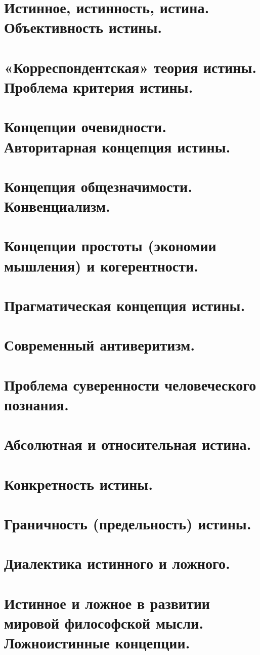 \section{ Истинное, истинность, истина. Объективность истины.}
\section{ «Корреспондентская» теория истины. Проблема критерия истины.}
\section{ Концепции очевидности. Авторитарная концепция истины.}
\section{ Концепция общезначимости. Конвенциализм.}
\section{ Концепции простоты (экономии мышления) и когерентности.}
\section{ Прагматическая концепция истины.}
\section{ Современный антиверитизм.}
\section{ Проблема суверенности человеческого познания.}
\section{ Абсолютная и относительная истина.}
\section{ Конкретность истины.}
\section{ Граничность (предельность) истины.}
\section{ Диалектика истинного и ложного.}
\section{ Истинное и ложное в развитии мировой философской мысли. Ложноистинные концепции.}
